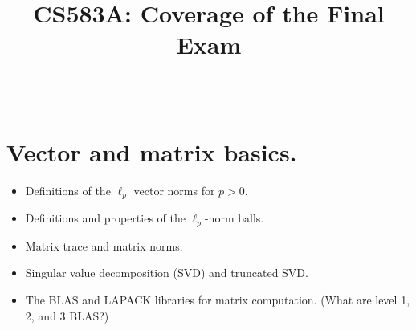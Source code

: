 \documentclass[11pt]{article}
\numberwithin{equation}{section}
\begin{document}


\title{CS583A: Coverage of the Final Exam}

\maketitle

\date{~~}

%
%


%


\section{Vector and matrix basics.}

\begin{itemize}
	\item 
	Definitions of the $\ell_p$ vector norms for $p > 0$.
	\item
	Definitions and properties of the $\ell_p$-norm balls.
	\item
	Matrix trace and matrix norms.
	\item
	Singular value decomposition (SVD) and truncated SVD.
	\item
	The BLAS and LAPACK libraries for matrix computation. (What are level 1, 2, and 3 BLAS?)
\end{itemize}
\end{document}
